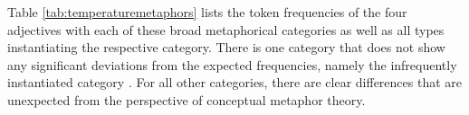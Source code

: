 Table \ref{tab:temperaturemetaphors} lists the token frequencies of the four adjectives with each of these broad metaphorical categories as well as all types instantiating the respective category. There is one category that does not show any significant deviations from the expected frequencies, namely the infrequently instantiated category . For all other categories, there are clear differences that are unexpected from the perspective of conceptual metaphor theory.

\begin{sidewaystable}[!htbp]
\caption{\textsc{temperature} metaphors (BNC-BABY)}
\label{tab:temperaturemetaphors}
\end{sidewaystable}
